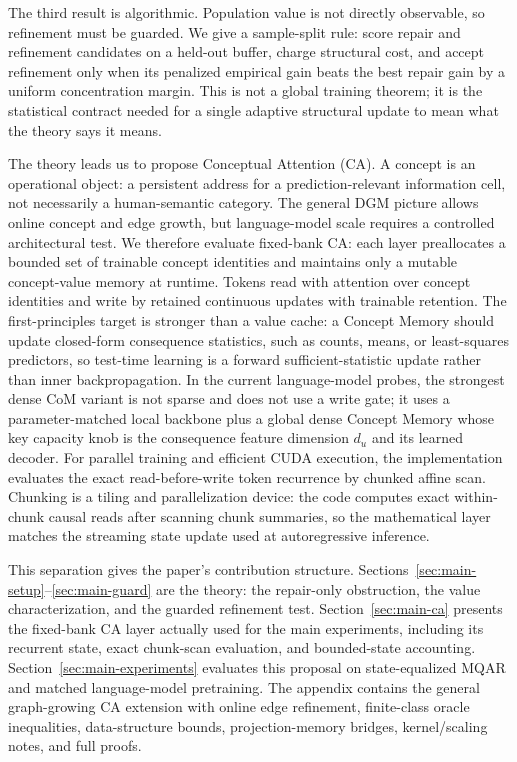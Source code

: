 The third result is algorithmic. Population value is not directly observable, so refinement must be guarded. We give a sample-split rule: score repair and refinement candidates on a held-out buffer, charge structural cost, and accept refinement only when its penalized empirical gain beats the best repair gain by a uniform concentration margin. This is not a global training theorem; it is the statistical contract needed for a single adaptive structural update to mean what the theory says it means.

The theory leads us to propose Conceptual Attention (CA). A concept is an operational object: a persistent address for a prediction-relevant information cell, not necessarily a human-semantic category. The general DGM picture allows online concept and edge growth, but language-model scale requires a controlled architectural test. We therefore evaluate fixed-bank CA: each layer preallocates a bounded set of trainable concept identities and maintains only a mutable concept-value memory at runtime. Tokens read with attention over concept identities and write by retained continuous updates with trainable retention. The first-principles target is stronger than a value cache: a Concept Memory should update closed-form consequence statistics, such as counts, means, or least-squares predictors, so test-time learning is a forward sufficient-statistic update rather than inner backpropagation. In the current language-model probes, the strongest dense CoM variant is not sparse and does not use a write gate; it uses a parameter-matched local backbone plus a global dense Concept Memory whose key capacity knob is the consequence feature dimension $d_u$ and its learned decoder. For parallel training and efficient CUDA execution, the implementation evaluates the exact read-before-write token recurrence by chunked affine scan. Chunking is a tiling and parallelization device: the code computes exact within-chunk causal reads after scanning chunk summaries, so the mathematical layer matches the streaming state update used at autoregressive inference.

This separation gives the paper's contribution structure. Sections~\ref{sec:main-setup}--\ref{sec:main-guard} are the theory: the repair-only obstruction, the value characterization, and the guarded refinement test. Section~\ref{sec:main-ca} presents the fixed-bank CA layer actually used for the main experiments, including its recurrent state, exact chunk-scan evaluation, and bounded-state accounting. Section~\ref{sec:main-experiments} evaluates this proposal on state-equalized MQAR and matched language-model pretraining. The appendix contains the general graph-growing CA extension with online edge refinement, finite-class oracle inequalities, data-structure bounds, projection-memory bridges, kernel/scaling notes, and full proofs.

